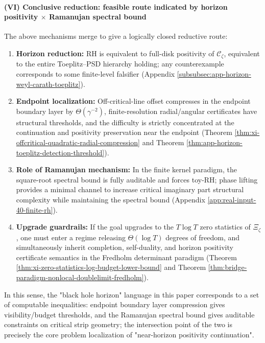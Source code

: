 \paragraph{(VI) Conclusive reduction: feasible route indicated by horizon positivity \(\times\) Ramanujan spectral bound}
The above mechanisms merge to give a logically closed reductive route:
\begin{enumerate}
  \item \textbf{Horizon reduction:} RH is equivalent to full-disk positivity of \(\mathscr{C}_{\zeta}\), equivalent to the entire Toeplitz--PSD hierarchy holding; any counterexample corresponds to some finite-level falsifier (Appendix \ref{subsubsec:app-horizon-weyl-carath-toeplitz}).
  \item \textbf{Endpoint localization:} Off-critical-line offset compresses in the endpoint boundary layer by \(\Theta(\gamma^{-2})\), finite-resolution radial/angular certificates have structural thresholds, and the difficulty is strictly concentrated at the continuation and positivity preservation near the endpoint (Theorem \ref{thm:xi-offcritical-quadratic-radial-compression} and Theorem \ref{thm:app-horizon-toeplitz-detection-threshold}).
  \item \textbf{Role of Ramanujan mechanism:} In the finite kernel paradigm, the square-root spectral bound is fully auditable and forces toy-RH; phase lifting provides a minimal channel to increase critical imaginary part structural complexity while maintaining the spectral bound (Appendix \ref{app:real-input-40-finite-rh}).
  \item \textbf{Upgrade guardrails:} If the goal upgrades to the \(T\log T\) zero statistics of \(\Xi_{\zeta}\), one must enter a regime releasing \(\Theta(\log T)\) degrees of freedom, and simultaneously inherit completion, self-duality, and horizon positivity certificate semantics in the Fredholm determinant paradigm (Theorem \ref{thm:xi-zero-statistics-log-budget-lower-bound} and Theorem \ref{thm:bridge-paradigm-nonlocal-doublelimit-fredholm}).
\end{enumerate}
In this sense, the "black hole horizon" language in this paper corresponds to a set of computable inequalities: endpoint boundary layer compression gives visibility/budget thresholds, and the Ramanujan spectral bound gives auditable constraints on critical strip geometry; the intersection point of the two is precisely the core problem localization of "near-horizon positivity continuation".

\endinput
